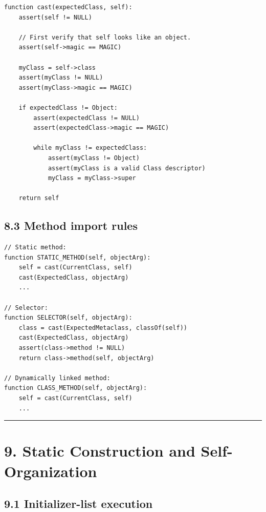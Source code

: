 \documentclass[11pt]{article}
\begin{document}
\begin{verbatim}
function cast(expectedClass, self):
    assert(self != NULL)

    // First verify that self looks like an object.
    assert(self->magic == MAGIC)

    myClass = self->class
    assert(myClass != NULL)
    assert(myClass->magic == MAGIC)

    if expectedClass != Object:
        assert(expectedClass != NULL)
        assert(expectedClass->magic == MAGIC)

        while myClass != expectedClass:
            assert(myClass != Object)
            assert(myClass is a valid Class descriptor)
            myClass = myClass->super

    return self
\end{verbatim}

\subsection{8.3 Method import rules}\label{method-import-rules}

\begin{verbatim}
// Static method:
function STATIC_METHOD(self, objectArg):
    self = cast(CurrentClass, self)
    cast(ExpectedClass, objectArg)
    ...

// Selector:
function SELECTOR(self, objectArg):
    class = cast(ExpectedMetaclass, classOf(self))
    cast(ExpectedClass, objectArg)
    assert(class->method != NULL)
    return class->method(self, objectArg)

// Dynamically linked method:
function CLASS_METHOD(self, objectArg):
    self = cast(CurrentClass, self)
    ...
\end{verbatim}

\begin{center}\rule{0.5\linewidth}{0.5pt}\end{center}

\section{9. Static Construction and
Self-Organization}\label{static-construction-and-self-organization}

\subsection{9.1 Initializer-list
execution}\label{initializer-list-execution}
\end{document}
